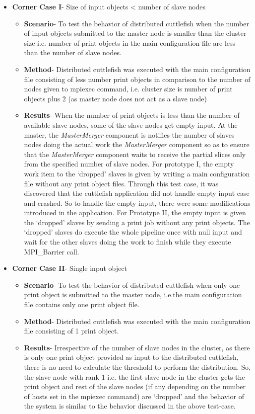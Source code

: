 \begin{enumerate}
\begin{itemize}
\item{\textbf{Corner Case I}- Size of input objects < number of slave nodes }
\begin{itemize}
\item{\textbf{Scenario}}- To test the behavior of distributed cuttlefish when the number of input objects submitted to the master node is smaller than the cluster size i.e. number of print objects in the main configuration file are less than the number of slave nodes.
\item{\textbf{Method}}- Distributed cuttlefish was executed with the main configuration file consisting of less number print objects in comparison to the number of nodes given to mpiexec command, i.e.  cluster size is number of print objects plus 2 (as master node does not act as a slave node)
\item{\textbf{Results}}- When the number of print objects is less than the number of available slave nodes, some of the slave nodes get empty input. At the master, the \textit{MasterMerger} component is notifies the number of slaves nodes doing the actual work the \textit{MasterMerger} component so as to ensure that the \textit{MasterMerger} component waits to receive the partial slices only from the specified number of slave nodes. For prototype I, the empty work item to the {\lq}dropped{\rq} slaves is given by writing a main configuration file without any print object files. Through this test case, it was discovered that the cuttlefish application did not handle empty input case and crashed. So to handle the empty input, there were some modifications introduced in the application. For Prototype II, the empty input is given the {\lq}dropped{\rq} slaves by sending a print job without any print objects. The {\lq}dropped{\rq} slaves do execute the whole pipeline once with null input and wait for the other slaves doing the work to finish while they execute MPI\_Barrier call.     
\end{itemize}
\item{\textbf{Corner Case II}- Single input object}
\begin{itemize}
\item{\textbf{Scenario}}- To test the behavior of distributed cuttlefish when only one print object is submitted to the master node, i.e.the main configuration file contains only one print object file.
\item{\textbf{Method}}- Distributed cuttlefish was executed with the main configuration file consisting of 1 print object.
\item{\textbf{Results}}- Irrespective of the number of slave nodes in the cluster, as there is only one print object provided as input to the distributed cuttlefish, there is no need to calculate the threshold to perform the distribution. So, the slave node with rank 1 i.e. the first slave node in the cluster gets the print object and rest of the slave nodes (if any depending on the number of hosts set in the mpiexec command) are {\lq}dropped{\rq} and the behavior of the system is similar to the behavior discussed in the above test-case.
\end{itemize}


\end{itemize}
\end{enumerate}
